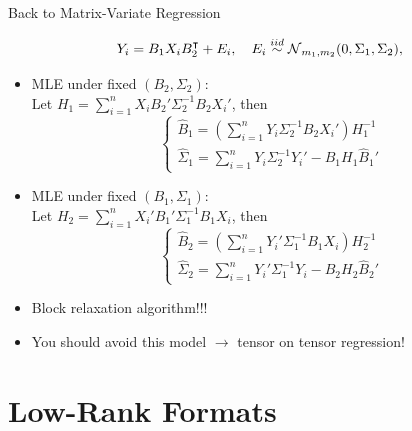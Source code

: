\documentclass{beamer}
\begin{document}
\begin{frame}{Back to Matrix-Variate Regression}
	\begin{center}
			$$ Y_i = B_1 X_i B_2^\intercal + E_i, \quad E_i \overset{iid}{\sim} \operatorname{\mathcal N}_{m_1,m_2}(0,\Sigma_1,\Sigma_2),$$
	\end{center}
	\small
	\begin{itemize}
	\item MLE under fixed $(B_2,\Sigma_2)$:\\
	Let $H_1 = \sum_{i=1}^n X_iB_2'\Sigma_2^{-1}B_2X_i'$, then
	$$
	 \begin{cases} 
       \widehat{B}_1 = (\sum_{i=1}^n Y_i\Sigma_2^{-1}B_2X_i')H_1^{-1}
        \\
      \widehat{\Sigma}_1 = \sum_{i=1}^n Y_i\Sigma_2^{-1}Y_i' - \widehat{B}_1 H_1\widehat{B}_1 '
   \end{cases}
   $$
   \item MLE under fixed $(B_1,\Sigma_1)$:\\
	Let $H_2 = \sum_{i=1}^n X_i'B_1'\Sigma_1^{-1}B_1X_i$, then
	$$
	 \begin{cases} 
       \widehat{B}_2 = (\sum_{i=1}^n Y_i'\Sigma_1^{-1}B_1X_i)H_2^{-1}
        \\
      \widehat{\Sigma}_2 = \sum_{i=1}^n Y_i'\Sigma_1^{-1}Y_i - \widehat{B}_2 H_2\widehat{B}_2 '
   \end{cases}
   $$
   \item Block relaxation algorithm!!!
   \item You should avoid this model $\rightarrow$ tensor on tensor regression!
	\end{itemize}
\end{frame}


\section{Low-Rank Formats}





\end{document}
